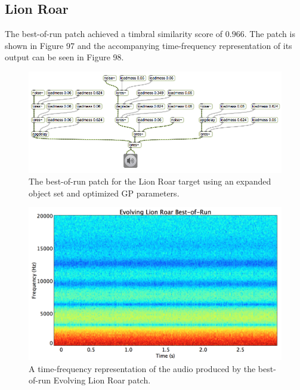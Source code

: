 \documentclass[12pt]{report} 	%
\numberwithin{figure}{chapter}
\numberwithin{table}{chapter}
\numberwithin{equation}{chapter}
\begin{document}
\begin{flushleft}
\subsection{Lion Roar}
The best-of-run patch achieved a timbral similarity score of $0.966$. The patch is shown in Figure 97 and the accompanying time-frequency representation of its output can be seen in Figure 98.
\begin{figure}[h!]
\begin{center}
\includegraphics[angle = 270, scale = 0.68]{Lion_Best}
\caption[Lion roar best-of-run patch]{The best-of-run patch for the Lion Roar target using an expanded object set and optimized GP parameters.}
\end{center}
\end{figure}
\begin{figure}[h!]
\begin{center}
\includegraphics[scale=0.35]{EvolvingLionRoarBestOfRunSTFT}
\caption[Best-of-run evolving lion roar time-frequency representation]{A time-frequency representation of the audio produced by the best-of-run Evolving Lion Roar patch.}
\end{center}
\vspace{12pt}
\end{figure}

\end{flushleft}
\end{document}
